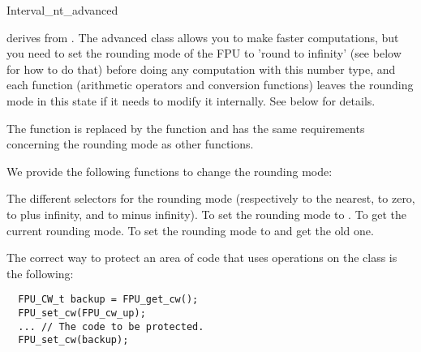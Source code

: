 \begin{ccAdvanced}
\samepage
\begin{ccClass} {Interval_nt_advanced}
\label{interval-adv}

 derives from .
The advanced class allows you to make faster computations, but you need to set
the rounding mode of the FPU to 'round to infinity' (see below for how to do
that) before doing any computation with this number type, and each function
(arithmetic operators and conversion functions)
leaves the rounding mode in this state if it needs to modify it internally.
See below for details.


The function  is replaced by the
function  and has the same
requirements concerning the rounding mode as other functions.



We provide the following functions to change the rounding mode:

       {The different selectors for the rounding mode (respectively to the
       nearest, to zero, to plus infinity, and to minus infinity).}
       {To set the rounding mode to .}
       {To get the current rounding mode.}
       {To set the rounding mode to  and get the old one. }

\ccExample

The correct way to protect an area of code that uses operations on the class
 is the following:

\begin{verbatim}
  FPU_CW_t backup = FPU_get_cw();
  FPU_set_cw(FPU_cw_up);
  ... // The code to be protected.
  FPU_set_cw(backup);
\end{verbatim}

\ccImplementation


\end{ccClass}
\end{ccAdvanced}
